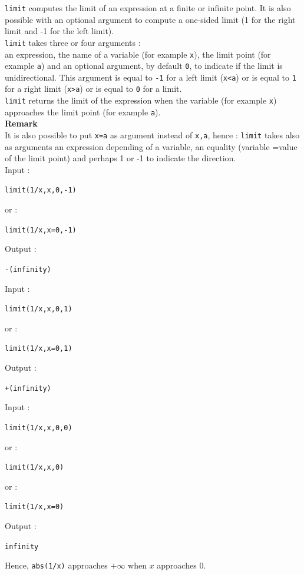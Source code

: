 \documentclass[a4paper,11pt]{book}
\begin{document}
{\tt limit} computes the limit of an expression at a finite or infinite point.
It is also possible with an optional argument to  compute a one-sided
limit (1 for the right limit  and -1 for the left limit).\\
{\tt limit} takes three or four arguments :\\
an expression, the name of a variable (for example {\tt x}), the limit point 
(for example {\tt a}) and an optional argument, by default {\tt 0}, to 
indicate if the limit is unidirectional. 
This argument is equal to 
{\tt -1} for a left limit ({\tt x<a}) or  is equal to {\tt  1} 
for a right limit ({\tt x>a}) or is equal to {\tt 0} for a limit.\\
{\tt limit} returns the limit of the expression when the  variable (for example
{\tt x}) approaches the limit point (for example {\tt a}).\\
{\bf Remark}\\
It is also possible to put {\tt x=a} as  argument instead of {\tt x,a}, hence :
{\tt limit} takes also as arguments an expression depending of a variable, 
an equality (variable =value of the limit point) and perhaps 1 or -1 to 
indicate the direction.\\ 
Input :
\begin{center}{\tt limit(1/x,x,0,-1)}\end{center}
or :
\begin{center}{\tt limit(1/x,x=0,-1)}\end{center}
Output :
\begin{center}{\tt -(infinity)}\end{center} 
Input :
\begin{center}{\tt limit(1/x,x,0,1)}\end{center}
or :
\begin{center}{\tt limit(1/x,x=0,1)}\end{center}
Output :
\begin{center}{\tt +(infinity)}\end{center} 
Input :
\begin{center}{\tt limit(1/x,x,0,0)}\end{center}
or :
\begin{center}{\tt limit(1/x,x,0)}\end{center}
or :
\begin{center}{\tt limit(1/x,x=0)}\end{center}
Output :
\begin{center}{\tt infinity}\end{center} 
Hence, {\tt abs(1/x)} approaches $+\infty$ when $x$ approaches $0$.
\end{document}
